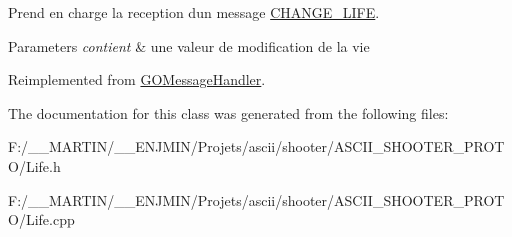Prend en charge la reception d\textquotesingle{}un message \hyperlink{struct_c_h_a_n_g_e___l_i_f_e}{C\+H\+A\+N\+G\+E\+\_\+\+L\+I\+FE}. 


\begin{DoxyParams}{Parameters}
{\em contient} & une valeur de modification de la vie \\
\hline
\end{DoxyParams}


Reimplemented from \hyperlink{class_g_o_message_handler}{G\+O\+Message\+Handler}.



The documentation for this class was generated from the following files\+:\begin{DoxyCompactItemize}
\item 
F\+:/\+\_\+\+\_\+\+M\+A\+R\+T\+I\+N/\+\_\+\+\_\+\+E\+N\+J\+M\+I\+N/\+Projets/ascii/shooter/\+A\+S\+C\+I\+I\+\_\+\+S\+H\+O\+O\+T\+E\+R\+\_\+\+P\+R\+O\+T\+O/Life.\+h\item 
F\+:/\+\_\+\+\_\+\+M\+A\+R\+T\+I\+N/\+\_\+\+\_\+\+E\+N\+J\+M\+I\+N/\+Projets/ascii/shooter/\+A\+S\+C\+I\+I\+\_\+\+S\+H\+O\+O\+T\+E\+R\+\_\+\+P\+R\+O\+T\+O/Life.\+cpp\end{DoxyCompactItemize}

